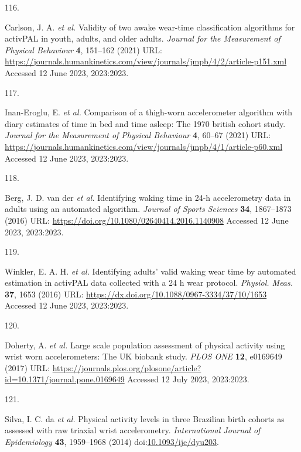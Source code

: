 \documentclass[
  10pt,
]{scrbook}
\newlength{\cslhangindent}
\newlength{\csllabelwidth}
\newlength{\cslentryspacingunit} %
\newenvironment{CSLReferences}[2] %
 {%
  \setlength{\parindent}{0pt}
  \ifodd #1
  \let\oldpar\par
  \def\par{\hangindent=\cslhangindent\oldpar}
  \fi
  \setlength{\parskip}{#2\cslentryspacingunit}
 }%
 {}
\newcommand{\CSLLeftMargin}[1]{\parbox[t]{\csllabelwidth}{#1}}
\newcommand{\CSLRightInline}[1]{\parbox[t]{\linewidth - \csllabelwidth}{#1}\break}
\let\originaltextbf\textbf
\renewcommand{\textbf}[1]{\textcolor{color1}{\originaltextbf{#1}}}
\begin{document}
\begin{CSLReferences}{0}{0}
\leavevmode{}%
\CSLLeftMargin{116. }%
\CSLRightInline{Carlson, J. A. \emph{et al.} Validity of two awake
wear-time classification algorithms for {activPAL} in youth, adults, and
older adults. \emph{Journal for the Measurement of Physical Behaviour}
\textbf{4}, 151--162 (2021) URL:
\url{https://journals.humankinetics.com/view/journals/jmpb/4/2/article-p151.xml}
Accessed 12 June 2023, 2023:2023.}

\leavevmode{}%
\CSLLeftMargin{117. }%
\CSLRightInline{Inan-Eroglu, E. \emph{et al.} Comparison of a thigh-worn
accelerometer algorithm with diary estimates of time in bed and time
asleep: The 1970 british cohort study. \emph{Journal for the Measurement
of Physical Behaviour} \textbf{4}, 60--67 (2021) URL:
\url{https://journals.humankinetics.com/view/journals/jmpb/4/1/article-p60.xml}
Accessed 12 June 2023, 2023:2023.}

\leavevmode{}%
\CSLLeftMargin{118. }%
\CSLRightInline{Berg, J. D. van der \emph{et al.} Identifying waking
time in 24-h accelerometry data in adults using an automated algorithm.
\emph{Journal of Sports Sciences} \textbf{34}, 1867--1873 (2016) URL:
\url{https://doi.org/10.1080/02640414.2016.1140908} Accessed 12 June
2023, 2023:2023.}

\leavevmode{}%
\CSLLeftMargin{119. }%
\CSLRightInline{Winkler, E. A. H. \emph{et al.} Identifying adults'
valid waking wear time by automated estimation in {activPAL} data
collected with a 24 h wear protocol. \emph{Physiol. Meas.} \textbf{37},
1653 (2016) URL: \url{https://dx.doi.org/10.1088/0967-3334/37/10/1653}
Accessed 12 June 2023, 2023:2023.}

\leavevmode{}%
\CSLLeftMargin{120. }%
\CSLRightInline{Doherty, A. \emph{et al.} Large scale population
assessment of physical activity using wrist worn accelerometers: The
{UK} biobank study. \emph{{PLOS} {ONE}} \textbf{12}, e0169649 (2017)
URL:
\url{https://journals.plos.org/plosone/article?id=10.1371/journal.pone.0169649}
Accessed 12 July 2023, 2023:2023.}

\leavevmode{}%
\CSLLeftMargin{121. }%
\CSLRightInline{Silva, I. C. da \emph{et al.} Physical activity levels
in three Brazilian birth cohorts as assessed with raw triaxial wrist
accelerometry. \emph{International Journal of Epidemiology} \textbf{43},
1959--1968 (2014)
doi:\href{https://doi.org/10.1093/ije/dyu203}{10.1093/ije/dyu203}.}


\end{CSLReferences}
\end{document}
